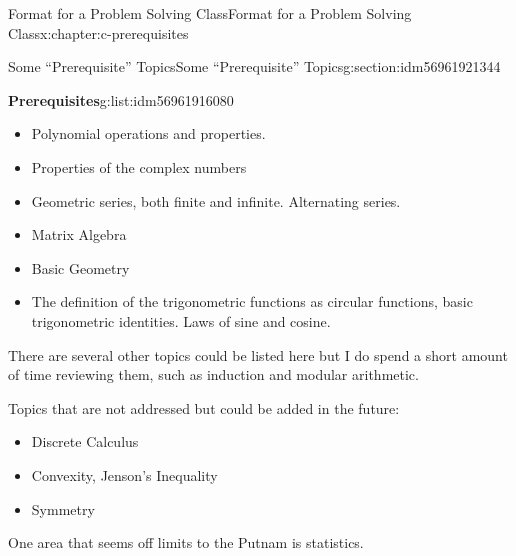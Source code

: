\documentclass[twoside,10pt,]{book}
\numberwithin{equation}{section}
\begin{document}
\begin{chapterptx}{Format for a Problem Solving Class}{}{Format for a Problem Solving Class}{}{}{x:chapter:c-prerequisites}
\begin{sectionptx}{Some ``Prerequisite'' Topics}{}{Some ``Prerequisite'' Topics}{}{}{g:section:idm56961921344}
\begin{listptx}{\textbf{Prerequisites}}{g:list:idm56961916080}{}%
%
\begin{itemize}[label=\textbullet]
\item{}Polynomial operations and properties.%
\item{}Properties of the complex numbers%
\item{}Geometric series, both finite and infinite.  Alternating series.%
\item{}Matrix Algebra%
\item{}Basic Geometry%
\item{}The definition of the trigonometric functions as circular functions, basic trigonometric identities.  Laws of sine and cosine.%
\end{itemize}
There are several other topics could be listed here but I do spend a short amount of time reviewing them, such as induction and modular arithmetic.%
\par
Topics that are not addressed but could be added in the future:%
\begin{itemize}[label=\textbullet]
\item{}Discrete Calculus%
\item{}Convexity, Jenson's Inequality%
\item{}Symmetry%
\end{itemize}
One area that seems off limits to the Putnam is statistics.%
\end{listptx}%
\end{sectionptx}
\end{chapterptx}
%
%
\typeout{************************************************}
\typeout{************************************************}
%
\end{document}

